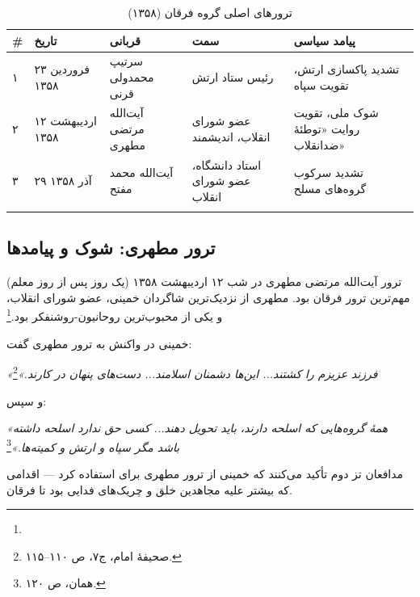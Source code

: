 \begin{longtable}{%
    >{\centering\arraybackslash}p{}
    >{\raggedleft\arraybackslash}p{}
    >{\raggedleft\arraybackslash}p{}
    >{\raggedleft\arraybackslash}p{}
    >{\raggedleft\arraybackslash}p{}}
\toprule
\rowcolor{cAccent!10}
\textbf{\#} & \textbf{تاریخ} & \textbf{قربانی} & \textbf{سمت} & \textbf{پیامد سیاسی} \\
\midrule
\endhead

۱ &
۲۳ فروردین ۱۳۵۸ &
سرتیپ محمدولی قرنی &
رئیس ستاد ارتش &
تشدید پاکسازی ارتش، تقویت سپاه \\
\midrule

۲ &
۱۲ اردیبهشت ۱۳۵۸ &
آیت‌الله مرتضی مطهری &
عضو شورای انقلاب، اندیشمند &
شوک ملی، تقویت روایت «توطئهٔ ضدانقلاب» \\
\midrule

۳ &
۲۹ آذر ۱۳۵۸ &
آیت‌الله محمد مفتح &
استاد دانشگاه، عضو شورای انقلاب &
تشدید سرکوب گروه‌های مسلح \\

\bottomrule
\caption{ترورهای اصلی گروه فرقان (۱۳۵۸)}
\label{tab:forqan-assassinations}
\end{longtable}

\subsection{ترور مطهری: شوک و پیامدها}

ترور آیت‌الله مرتضی مطهری در شب ۱۲ اردیبهشت ۱۳۵۸ (یک روز پس از روز معلم) مهم‌ترین ترور فرقان بود. مطهری از نزدیک‌ترین شاگردان خمینی، عضو شورای انقلاب، و یکی از محبوب‌ترین روحانیون-روشنفکر بود.\footnote{}

\begin{warningBox}
خمینی در واکنش به ترور مطهری گفت:

\textit{«فرزند عزیزم را کشتند... این‌ها دشمنان اسلامند... دست‌های پنهان در کارند.»}\footnote{صحیفهٔ امام، ج۷، ص ۱۱۰–۱۱۵.}

و سپس:

\textit{«همهٔ گروه‌هایی که اسلحه دارند، باید تحویل دهند... کسی حق ندارد اسلحه داشته باشد مگر سپاه و ارتش و کمیته‌ها.»}\footnote{همان، ص ۱۲۰.}

مدافعان تز دوم تأکید می‌کنند که خمینی از ترور مطهری برای  استفاده کرد — اقدامی که بیشتر علیه مجاهدین خلق و چریک‌های فدایی بود تا فرقان.
\end{warningBox}


